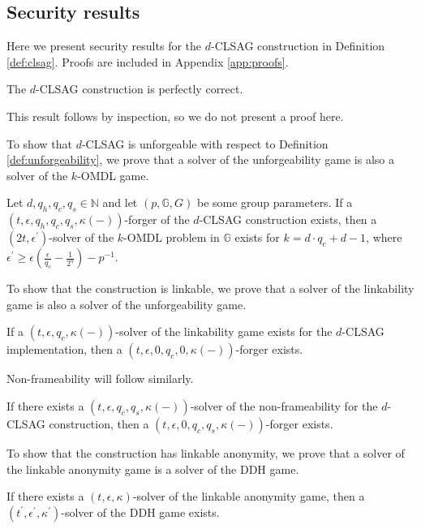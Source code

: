 \documentclass[draft]{llncs} %
\begin{document}
\subsection{Security results}\label{def:results}
Here we present security results for the $d$-CLSAG construction in Definition \ref{def:clsag}. Proofs are included in Appendix \ref{app:proofs}.

\begin{theorem}[Correctness]
The $d$-CLSAG construction is perfectly correct.
\end{theorem}
This result follows by inspection, so we do not present a proof here.

To show that $d$-CLSAG is unforgeable with respect to Definition \ref{def:unforgeability}, we prove that a solver of the unforgeability game is also a solver of the $k$-OMDL game.
\begin{theorem}[Unforgeability]\label{thm:unforgeability}
Let $d, q_h, q_c, q_s \in \mathbb{N}$  and let $(p,\mathbb{G},G)$ be some group parameters. If a $(t, \epsilon, q_h, q_c, q_s, \kappa(-))$-forger of the $d$-CLSAG construction exists, then a $(2t, \epsilon^\prime)$-solver of the $k$-OMDL problem in $\mathbb{G}$ exists for $k = d\cdot q_c + d - 1$, where $\epsilon^\prime \geq \epsilon\left(\frac{\epsilon}{q_c} - \frac{1}{2^\eta}\right) - p^{-1}$.
\end{theorem}

To show that the construction is linkable, we prove that a solver of the linkability game is also a solver of the unforgeability game.
\begin{theorem}[Linkability]\label{thm:linkability}
If a $(t, \epsilon, q_c, \kappa(-))$-solver of the linkability game exists for the $d$-CLSAG implementation, then a $(t, \epsilon, 0, q_c, 0, \kappa(-))$-forger exists.
\end{theorem}

Non-frameability will follow similarly.
\begin{theorem}\label{thm:frameability}
If there exists a $(t, \epsilon, q_c, q_s, \kappa(-))$-solver of the non-frameability for the $d$-CLSAG construction, then a $(t, \epsilon, 0, q_c, q_s, \kappa(-))$-forger exists.
\end{theorem}

To show that the construction has linkable anonymity, we prove that a solver of the linkable anonymity game is a solver of the DDH game.
\begin{theorem}\label{thm:anonymity}
If there exists a $(t, \epsilon, \kappa)$-solver of the linkable anonymity game, then a $(t^\prime, \epsilon^\prime, \kappa^\prime)$-solver of the DDH game exists.
\end{theorem}
\end{document}
